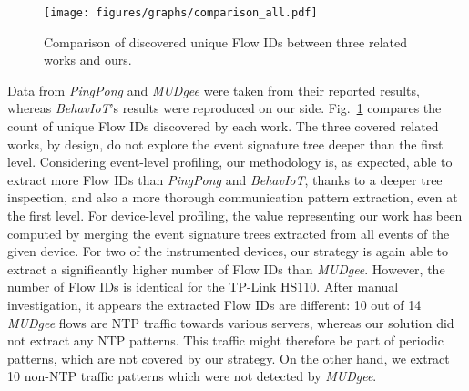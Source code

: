 \begin{figure}
  \centering
  \texttt{[image: figures/graphs/comparison\_all.pdf]}
  \caption{Comparison of discovered unique Flow IDs between three related works and ours.}
  \label{fig:comparison_all}
\end{figure}

Data from \emph{PingPong} and \emph{MUDgee} were taken from their reported results,
whereas \emph{BehavIoT}'s results were reproduced on our side.
Fig.~\ref{fig:comparison_all} compares the count of unique Flow IDs discovered by each work.
The three covered related works, by design,
do not explore the event signature tree deeper than the first level.
Considering event-level profiling,
our methodology is, as expected, able to extract more Flow IDs
than \emph{PingPong} and \emph{BehavIoT},
thanks to a deeper tree inspection,
and also a more thorough communication pattern extraction, even at the first level.
For device-level profiling,
the value representing our work has been computed by merging the event signature trees
extracted from all events of the given device.
For two of the instrumented devices,
our strategy is again able to extract a significantly higher number of Flow IDs than \emph{MUDgee}.
However, the number of Flow IDs is identical for the TP-Link HS110.
After manual investigation,
it appears the extracted Flow IDs are different:
10 out of 14 \emph{MUDgee} flows are NTP traffic towards various servers,
whereas our solution did not extract any NTP patterns.
This traffic might therefore be part of periodic patterns,
which are not covered by our strategy.
On the other hand, we extract 10 non-NTP traffic patterns
which were not detected by \emph{MUDgee}.
